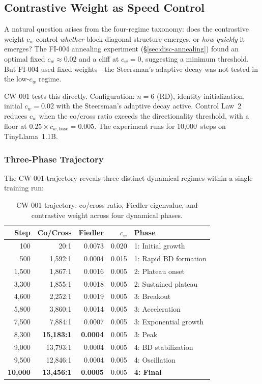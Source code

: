 \subsection{Contrastive Weight as Speed Control}
\label{sec:disc-whisper}

A natural question arises from the four-regime taxonomy: does the
contrastive weight $c_w$ control \emph{whether} block-diagonal structure
emerges, or \emph{how quickly} it emerges? The FI-004 annealing experiment
(\S\ref{sec:disc-annealing}) found an optimal fixed
$c_w \approx 0.02$ and a cliff at $c_w = 0$, suggesting a minimum
threshold. But FI-004 used fixed weights---the Steersman's adaptive decay
was not tested in the low-$c_w$ regime.

CW-001 tests this directly. Configuration: $n = 6$ (RD), identity
initialization, initial $c_w = 0.02$ with the Steersman's adaptive
decay active. Control Law~2 reduces $c_w$ when the co/cross ratio
exceeds the directionality threshold, with a floor at
$0.25 \times c_{w,\text{base}} = 0.005$. The experiment runs for
10{,}000~steps on TinyLlama~1.1B.

\subsubsection{Three-Phase Trajectory}

The CW-001 trajectory reveals three distinct dynamical regimes within
a single training run:

\begin{table}[h]
\centering
\small
\begin{tabular}{@{}rrrrl@{}}
\toprule
Step & Co/Cross & Fiedler & $c_w$ & Phase \\
\midrule
100 & 20:1 & 0.0073 & 0.020 & 1: Initial growth \\
500 & 1{,}592:1 & 0.0004 & 0.015 & 1: Rapid BD formation \\
1{,}500 & 1{,}867:1 & 0.0016 & 0.005 & 2: Plateau onset \\
3{,}300 & 1{,}855:1 & 0.0018 & 0.005 & 2: Sustained plateau \\
4{,}600 & 2{,}252:1 & 0.0019 & 0.005 & 3: Breakout \\
5{,}800 & 3{,}860:1 & 0.0014 & 0.005 & 3: Acceleration \\
7{,}500 & 7{,}884:1 & 0.0007 & 0.005 & 3: Exponential growth \\
8{,}300 & \textbf{15{,}183:1} & \textbf{0.0004} & 0.005 & 3: Peak \\
9{,}000 & 13{,}793:1 & 0.0004 & 0.005 & 4: BD stabilization \\
9{,}500 & 12{,}846:1 & 0.0004 & 0.005 & 4: Oscillation \\
\textbf{10{,}000} & \textbf{13{,}456:1} & \textbf{0.0005} & 0.005 & \textbf{4: Final} \\
\bottomrule
\end{tabular}
\caption{CW-001 trajectory: co/cross ratio, Fiedler eigenvalue, and
contrastive weight across four dynamical phases.}
\label{tab:cw001-trajectory}
\end{table}

